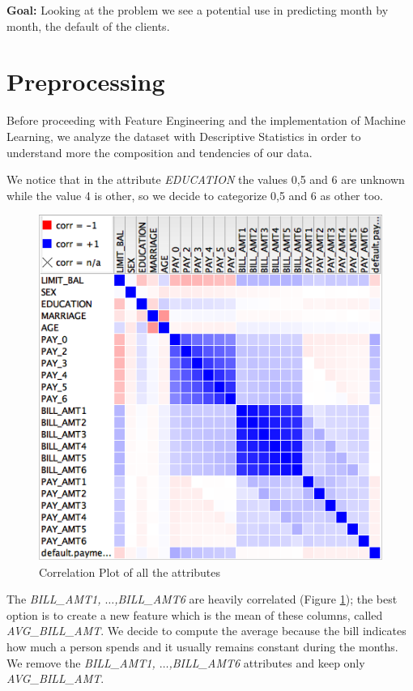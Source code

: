 \documentclass[fleqn,10pt]{SelfArx} %
\begin{document}
	
	\textbf{Goal:}\newline
	Looking at the problem we see a potential use in predicting month by month, the default of the clients.
	
	\section{Preprocessing}
	Before proceeding with Feature Engineering and the  implementation of Machine Learning, we analyze the dataset with Descriptive Statistics in order to understand more the composition and tendencies of our data.
	
	We notice that in the attribute \textit{EDUCATION} the values 0,5 and 6 are unknown while the value 4 is other, so we decide to categorize 0,5 and 6 as other too.
	\begin{figure}[h]
		\includegraphics[width=\linewidth]{correlation.png}
		\caption{Correlation Plot of all the attributes}
		\label{fig:corr}
	\end{figure}
	
	
	The \textit{BILL\_AMT1, $\hdots$,BILL\_AMT6} are heavily correlated (Figure \ref{fig:corr}); the best option is to create a new feature which is the mean of these columns, called \textit{AVG\_BILL\_AMT}.
	We decide to compute the average because the bill indicates how much a person spends and it usually remains constant during the months. We remove the \textit{BILL\_AMT1, $\hdots$,BILL\_AMT6} attributes and keep only \textit{AVG\_BILL\_AMT}.
	
\end{document}
